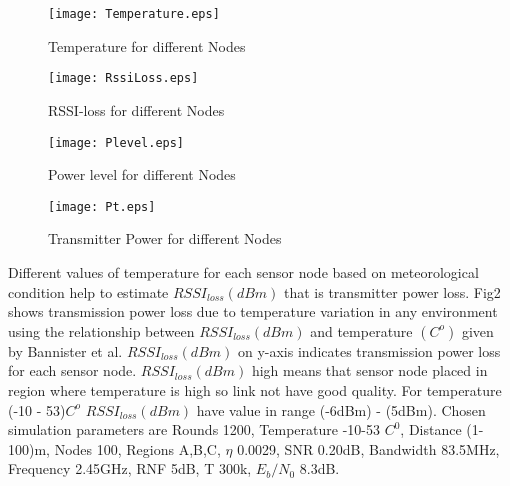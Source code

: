 \documentclass{article}
\begin{document}
\begin{figure}[h]
\begin{center}
\texttt{[image: Temperature.eps]}
\vspace{-0.5cm}
\caption{Temperature for different Nodes}
\end{center}
\end{figure}

\begin{figure}[h]
\begin{center}
\texttt{[image: RssiLoss.eps]}
\vspace{-0.5cm}
\caption{RSSI-loss for different Nodes}
\end{center}
\end{figure}

\begin{figure}[h]
\begin{center}
\texttt{[image: Plevel.eps]}
\vspace{-0.5cm}
\caption{Power level for different Nodes}
\end{center}
\end{figure}

\begin{figure}[h]
\begin{center}
\texttt{[image: Pt.eps]}
\vspace{-0.5cm}
\caption{Transmitter Power for different Nodes}
\end{center}
\end{figure}

Different values of temperature for each sensor node based on meteorological condition  help to estimate $RSSI_{loss}(dBm)$ that is transmitter power loss. Fig2 shows transmission power loss due to temperature variation in any environment using the relationship between $RSSI_{loss}(dBm)$ and temperature $(C^{o})$ given by Bannister et al. $RSSI_{loss}(dBm)$  on y-axis indicates transmission power loss for each  sensor node. $RSSI_{loss}(dBm)$ high means that sensor node  placed in region where temperature is high so link not have good quality. For temperature (-10 - 53)$C^{o}$  $RSSI_{loss}(dBm)$ have value in range (-6dBm) - (5dBm). Chosen simulation parameters are Rounds 1200, Temperature -10-53 $C^{0}$, Distance (1-100)m, Nodes 100, Regions A,B,C, $\eta$ 0.0029, SNR 0.20dB, Bandwidth 83.5MHz, Frequency 2.45GHz, RNF 5dB, T 300k, $E_{b}/N_{0}$  8.3dB.
\end{document}
